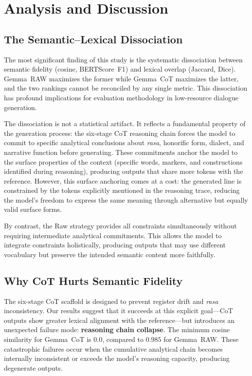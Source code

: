 \documentclass[11pt]{article}
\begin{document}
\section{Analysis and Discussion}
\label{sec:discussion}

\subsection{The Semantic--Lexical Dissociation}
\label{subsec:dissociation}

The most significant finding of this study is the systematic dissociation between semantic fidelity (cosine, BERTScore~F1) and lexical overlap (Jaccard, Dice). Gemma~RAW maximizes the former while Gemma~CoT maximizes the latter, and the two rankings cannot be reconciled by any single metric. This dissociation has profound implications for evaluation methodology in low-resource dialogue generation.

The dissociation is not a statistical artifact. It reflects a fundamental property of the generation process: the six-stage CoT reasoning chain forces the model to commit to specific analytical conclusions about \textit{rasa}, honorific form, dialect, and narrative function before generating. These commitments anchor the model to the surface properties of the context (specific words, markers, and constructions identified during reasoning), producing outputs that share more tokens with the reference. However, this surface anchoring comes at a cost: the generated line is constrained by the tokens explicitly mentioned in the reasoning trace, reducing the model's freedom to express the same meaning through alternative but equally valid surface forms.

By contrast, the Raw strategy provides all constraints simultaneously without requiring intermediate analytical commitments. This allows the model to integrate constraints holistically, producing outputs that may use different vocabulary but preserve the intended semantic content more faithfully.

\subsection{Why CoT Hurts Semantic Fidelity}
\label{subsec:cot-hurts}

The six-stage CoT scaffold is designed to prevent register drift and \textit{rasa} inconsistency. Our results suggest that it succeeds at this explicit goal---CoT outputs show greater lexical alignment with the reference---but introduces an unexpected failure mode: \textbf{reasoning chain collapse}. The minimum cosine similarity for Gemma~CoT is $0.0$, compared to $0.985$ for Gemma~RAW. These catastrophic failures occur when the cumulative analytical chain becomes internally inconsistent or exceeds the model's reasoning capacity, producing degenerate outputs.
\end{document}
